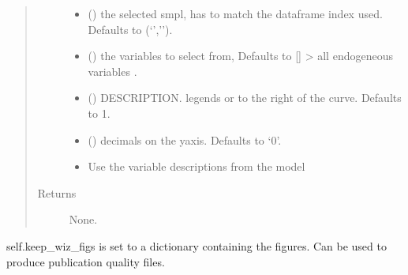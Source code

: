 \documentclass[letterpaper,10pt,english]{sphinxmanual}
\begin{document}
\begin{fulllineitems}
\begin{fulllineitems}
\begin{quote}
\begin{description}
\begin{itemize}
\item {} 
\sphinxAtStartPar
{} (\sphinxstyleliteralemphasis{\sphinxupquote{, }}) \textendash{} the selected smpl, has to match the dataframe index used. Defaults to (‘’,’’).

\item {} 
\sphinxAtStartPar
{} (\sphinxstyleliteralemphasis{\sphinxupquote{, }}) \textendash{} the variables to select from, Defaults to {[}{]} \sphinxhyphen{}\textgreater{} all endogeneous variables .

\item {} 
\sphinxAtStartPar
{} (\sphinxstyleliteralemphasis{\sphinxupquote{, }}) \textendash{} DESCRIPTION. legends or to the right of the curve. Defaults to 1.

\item {} 
\sphinxAtStartPar
{} (\sphinxstyleliteralemphasis{\sphinxupquote{, }}) \textendash{} decimals on the y\sphinxhyphen{}axis. Defaults to ‘0’.

\item {} 
\sphinxAtStartPar
{} \textendash{} Use the variable descriptions from the model

\end{itemize}

\item[{Returns}] \leavevmode
\sphinxAtStartPar
None.

\end{description}\end{quote}

\sphinxAtStartPar
self.keep\_wiz\_figs is set to a dictionary containing the figures. Can be used to produce publication
quality files.

\end{fulllineitems}



\end{fulllineitems}
\end{document}
